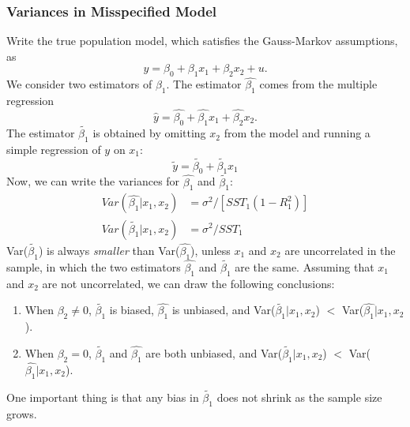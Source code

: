 \documentclass[a4paper, 10pt]{article}
\theoremstyle{definition}	%
\begin{document}
\subsubsection{Variances in Misspecified Model}
Write the true population model, which satisfies the Gauss-Markov assumptions, as
\begin{equation*}
    y = \beta_0 + \beta_1x_1 + \beta_2x_2 + u.
\end{equation*}
We consider two estimators of $\beta_1$. The estimator $\hat{\beta_1}$ comes from the multiple regression
\begin{equation}
    \hat{y} = \hat{\beta_0} + \hat{\beta_1}x_1 + \hat{\beta_2}x_2. \label{eq:p.92,3.52}
\end{equation}
The estimator $\tilde{\beta_1}$ is obtained by omitting $x_2$ from the model and running a simple regression of $y$ on $x_1$: 
\begin{equation}
    \tilde{y} = \tilde{\beta_0} + \tilde{\beta_1}x_1 \label{eq:p.92,3.53}
\end{equation}
Now, we can write the variances for $\hat{\beta_1}$ and $\tilde{\beta_1}$:
\begin{align}
    Var(\hat{\beta_1}|x_1,x_2) &= \sigma^2 / \left[SST_1 (1 - R_1^2) \right]\label{eq:p.93,3.54} \\
    Var(\tilde{\beta_1}|x_1,x_2) &= \sigma^2 / SST_1 \label{eq:p.93,3.55}
\end{align}
Var($\tilde{\beta_1}$) is always \textit{smaller} than Var($\hat{\beta_1}$), unless $x_1$ and $x_2$ are uncorrelated in the sample, in which the two estimators $\hat{\beta_1}$ and $\tilde{\beta_1}$ are the same. Assuming that $x_1$ and $x_2$ are not uncorrelated, we can draw the following conclusions:
\begin{enumerate}
    \item When $\beta_2 \neq 0$, $\tilde{\beta_1}$ is biased, $\hat{\beta_1}$ is unbiased, and Var($\tilde{\beta_1}|x_1,x_2$) $<$ Var($\hat{\beta_1}|x_1,x_2$).
    \item When $\beta_2 = 0$, $\tilde{\beta_1}$ and $\hat{\beta_1}$ are both unbiased, and Var($\tilde{\beta_1}|x_1,x_2$) $<$ Var($\hat{\beta_1}|x_1,x_2$).
\end{enumerate}
One important thing is that any bias in $\tilde{\beta_1}$ does not shrink as the sample size grows.
\end{document}
